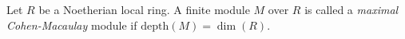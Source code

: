 \begin{definition}
\label{definition-maximal-CM}
Let $R$ be a Noetherian local ring.
A finite module $M$ over $R$ is called a {\it maximal Cohen-Macaulay}
module if $\text{depth}(M) = \dim(R)$.
\end{definition}